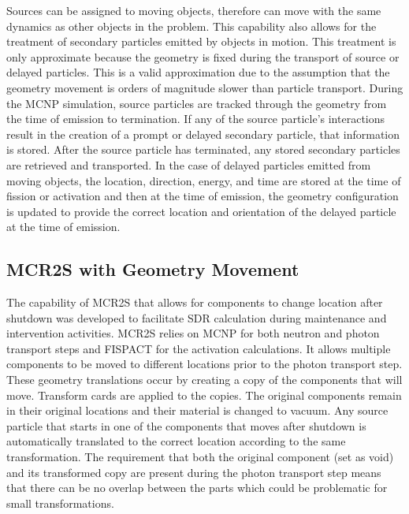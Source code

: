Sources can be assigned to moving objects, therefore can move with the
same dynamics as other objects in the problem.
This capability also allows for the treatment of secondary particles emitted by
objects in motion. This treatment is only approximate because the geometry is fixed during the
transport of source or delayed particles. This is a valid approximation due to
the assumption that the geometry movement is orders of magnitude slower than
particle transport.
During the MCNP simulation, source particles are tracked through the geometry
from the time of emission to termination.  If any of the source particle's
interactions result in the creation of a prompt or delayed secondary particle,
that information is stored.  After the source particle has terminated, any
stored secondary particles are retrieved and transported.
In the case of delayed particles emitted from moving objects, the location, direction, energy, and
time are stored at the time of fission or activation and then at the time of
emission, the geometry configuration is updated to provide the correct 
location and orientation of the delayed particle at the time of emission. 



\subsection{MCR2S with Geometry Movement}
The capability of MCR2S that allows for components to change location after
shutdown was developed to facilitate SDR calculation during maintenance and
intervention activities.  MCR2S relies on MCNP for both neutron and photon
transport steps and FISPACT for the activation calculations. 
It allows multiple components to be moved to
different locations prior to the photon transport step.
These geometry translations occur by creating a copy of the
components that will move.  Transform cards are applied to the copies. 
The original components remain in their original locations and their material
is changed to vacuum.  Any source particle that starts in one of the
components that moves after shutdown is automatically translated to the correct
location according to the same transformation.
The requirement that both the original component (set as void) and its
transformed copy are present during the photon transport step means that there
can be no overlap between the parts which could be problematic for small
transformations.

